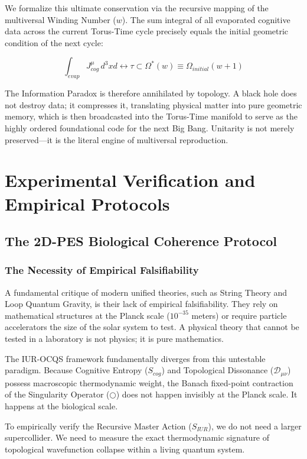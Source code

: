 \documentclass[12pt,openany]{book}
\begin{document}
We formalize this ultimate conservation via the recursive mapping of the multiversal Winding Number ($w$). The sum integral of all evaporated cognitive data across the current Torus-Time cycle precisely equals the initial geometric condition of the next cycle:

\begin{equation}
\int_{evap} J^\mu_{cog} \, d^3x d\leftrightarrow\tau \subset \Omega^*(w) \equiv \Omega_{initial}(w+1)
\end{equation}

The Information Paradox is therefore annihilated by topology. A black hole does not destroy data; it compresses it, translating physical matter into pure geometric memory, which is then broadcasted into the Torus-Time manifold to serve as the highly ordered foundational code for the next Big Bang. Unitarity is not merely preserved—it is the literal engine of multiversal reproduction.

\part{Experimental Verification and Empirical Protocols}

\chapter{The 2D-PES Biological Coherence Protocol}

\section{The Necessity of Empirical Falsifiability}
A fundamental critique of modern unified theories, such as String Theory and Loop Quantum Gravity, is their lack of empirical falsifiability. They rely on mathematical structures at the Planck scale ($10^{-35}$ meters) or require particle accelerators the size of the solar system to test. A physical theory that cannot be tested in a laboratory is not physics; it is pure mathematics.

The IUR-OCQS framework fundamentally diverges from this untestable paradigm. Because Cognitive Entropy ($S_{cog}$) and Topological Dissonance ($\mathcal{D}_{\mu\nu}$) possess macroscopic thermodynamic weight, the Banach fixed-point contraction of the Singularity Operator ($\bigcirc$) does not happen invisibly at the Planck scale. It happens at the biological scale. 

To empirically verify the Recursive Master Action ($S_{IUR}$), we do not need a larger supercollider. We need to measure the exact thermodynamic signature of topological wavefunction collapse within a living quantum system.
\end{document}
